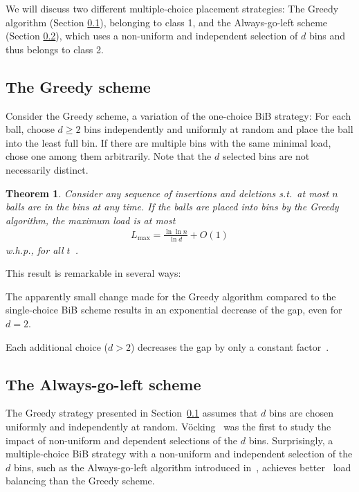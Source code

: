 \documentclass[a4paper,12pt]{article}
\newcommand\load{L_{\mathrm{max}}}
\newtheorem{theorem}{Theorem}
\begin{document}
We will discuss two different multiple-choice placement strategies: The Greedy algorithm (Section \ref{sec:greedy}), belonging to class 1, and the Always-go-left scheme (Section \ref{sec:AlwaysGoLeft}), which uses a non-uniform and independent selection of $d$ bins and thus belongs to class 2.

\subsection{The Greedy scheme}
\label{sec:greedy}
Consider the Greedy scheme, a variation of the one-choice BiB strategy: For each ball, choose $d \geq 2$ bins independently and uniformly at random and place the ball into the least full bin. If there are multiple bins with the same minimal load, chose one among them arbitrarily. Note that the $d$ selected bins are not necessarily distinct. 

\begin{theorem}
\label{theorem:greedy}
Consider any sequence of insertions and deletions s.t.~at most $n$ balls are in the bins at any time. If the balls are placed into bins by the Greedy algorithm, the maximum load is at most
\begin{align*}
\load = \frac{\ln \ln n}{\ln d}+ O(1)
\end{align*}
w.h.p., for all $t$~\cite{ABKU99, BCSV06}.
\end{theorem}

This result is remarkable in several ways:
\begin{compactitem}
\item The apparently small change made for the Greedy algorithm compared to the single-choice BiB scheme results in an exponential decrease of the gap, even for $d=2$. 
\item Each additional choice ($d > 2$) decreases the gap by only a constant factor~\cite{MRS01}.
\end{compactitem}

\subsection{The Always-go-left scheme}
\label{sec:AlwaysGoLeft}
The Greedy strategy presented in Section~\ref{sec:greedy} assumes that $d$ bins are chosen uniformly and independently at random. V\"ocking~\cite{VOC03} was the first to study the impact of non-uniform and dependent selections of the $d$ bins. Surprisingly, a multiple-choice BiB strategy with a non-uniform and independent selection of the $d$ bins, such as the Always-go-left algorithm introduced in~\cite{VOC03}, achieves better~\cite{BCSV06} load balancing than the Greedy scheme.
\end{document}
